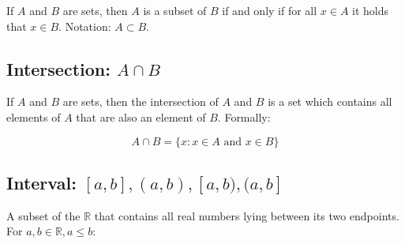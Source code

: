 \documentclass[titlepage]{article}
\begin{document}
        If $A$ and $B$ are sets, then $A$ is a subset of $B$ if and only if
        for all $x \in A$ it holds that $x \in B$. Notation: $A \subset B$.

      \subsection{Intersection: $A \cap B$}

        If $A$ and $B$ are sets, then the intersection of $A$ and $B$ is a set
        which contains all elements of $A$ that are also an element of $B$.
        Formally:

        $$A \cap B = \{ x : x \in A \text{ and } x \in B \}$$

      \subsection{Interval: $[a, b], (a, b), [a, b), (a, b]$}

        A subset of the $\mathbb{R}$ that contains all real numbers lying
        between its two endpoints. For $a, b \in \mathbb{R}, a \leq b$:
\end{document}
